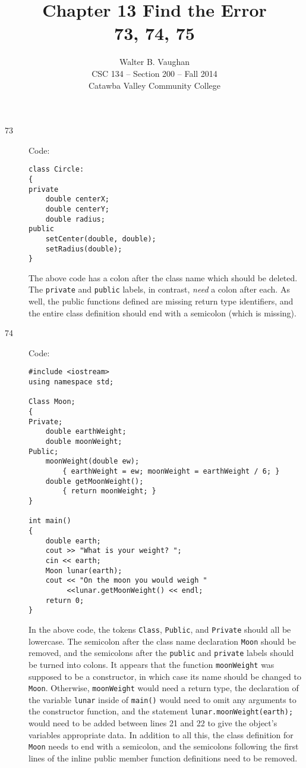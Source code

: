 \documentclass[11pt]{article}
\author{Walter B. Vaughan\\
        \small CSC 134 -- Section 200 -- Fall 2014\\
        \small Catawba Valley Community College}
\title{Chapter 13 Find the Error \\
       \footnotesize{73, 74, 75}}
\date{\vspace{-5ex}}
\begin{document}
\maketitle

\begin{description}

    \item[73] Code:
\begin{lstlisting}
class Circle:
{
private
    double centerX;
    double centerY;
    double radius;
public
    setCenter(double, double);
    setRadius(double);
}
\end{lstlisting}
    The above code has a colon after the class name which should be deleted. The \lstinline{private} and \lstinline{public} labels, in contrast, \emph{need} a colon after each. As well, the public functions defined are missing return type identifiers, and the entire class definition should end with a semicolon (which is missing).

\newpage %
    \item[74] Code:
\begin{lstlisting}
#include <iostream>
using namespace std;

Class Moon;
{
Private;
    double earthWeight;
    double moonWeight;
Public;
    moonWeight(double ew);
        { earthWeight = ew; moonWeight = earthWeight / 6; }
    double getMoonWeight();
        { return moonWeight; }
}

int main()
{
    double earth;
    cout >> "What is your weight? ";
    cin << earth;
    Moon lunar(earth);
    cout << "On the moon you would weigh "
         <<lunar.getMoonWeight() << endl;
    return 0;
}
\end{lstlisting}
    In the above code, the tokens \lstinline{Class}, \lstinline{Public}, and \lstinline{Private} should all be lowercase. The semicolon after the class name declaration \lstinline{Moon} should be removed, and the semicolons after the \lstinline{public} and \lstinline{private} labels should be turned into colons. It appears that the function \lstinline{moonWeight} was supposed to be a constructor, in which case its name should be changed to \lstinline{Moon}. Otherwise, \lstinline{moonWeight} would need a return type, the declaration of the variable \lstinline{lunar} inside of \lstinline{main()} would need to omit any arguments to the constructor function, and the statement \lstinline{lunar.moonWeight(earth);} would need to be added between lines 21 and 22 to give the object's variables appropriate data. In addition to all this, the class definition for \lstinline{Moon} needs to end with a semicolon, and the semicolons following the first lines of the inline public member function definitions need to be removed.



\end{description}
\end{document}
